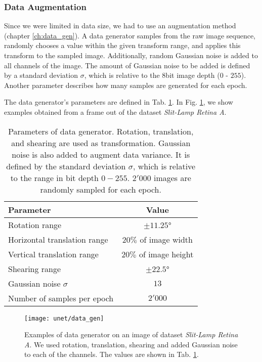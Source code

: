 \clearpage
\subsubsection{Data Augmentation} \label{results_data_gen}
Since we were limited in data size, we had to use an augmentation method (chapter \ref{ch:data_gen}). A data generator samples from the raw image sequence, randomly chooses a value within the given transform range, and applies this transform to the sampled image. Additionally, random Gaussian noise is added to all channels of the image. The amount of Gaussian noise to be added is defined by a standard deviation $\sigma$, which is relative to the $8$bit image depth ($0$ - $255$). Another parameter describes how many samples are generated for each epoch.

The data generator's parameters are defined in Tab. \ref{tab:data_gen_param}. In Fig. \ref{fig:data_gen}, we show examples obtained from a frame out of the dataset \textit{Slit-Lamp Retina A}.
\vspace{20pt}

\begin{table}[!htbp]
   \centering
   \caption[Data generator parameters]{Parameters of data generator. Rotation, translation, and shearing are used as transformation. Gaussian noise is also added to augment data variance. It is defined by the standard deviation $\sigma$, which is relative to the range in bit depth $0-255$. $2'000$ images are randomly sampled for each epoch.}
   \begin{tabular}{l|c}
      \toprule
      \textbf{Parameter} & \textbf{Value} \\
      \midrule
      Rotation range & $\pm11.25$° \\
      Horizontal translation range & $20\%$ of image width \\
      Vertical translation range & $20\%$ of image height \\
      Shearing range & $\pm22.5$° \\
      \midrule
      Gaussian noise $\sigma$ & $13$ \\
      \midrule
      Number of samples per epoch & $2'000$ \\
      \bottomrule
   \end{tabular}
   \label{tab:data_gen_param}
\end{table}
\vspace{30pt}

\begin{figure}[!htbp]
  \centering
  \texttt{[image: unet/data\_gen]}
  \caption[Examples of data generator]{Examples of data generator on an image of dataset \textit{Slit-Lamp Retina A}. We used rotation, translation, shearing and added Gaussian noise to each of the channels. The values are shown in Tab. \ref{tab:data_gen_param}.}
  \label{fig:data_gen}
\end{figure}

